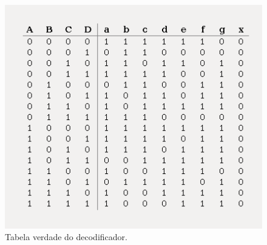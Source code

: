 \documentclass[
	12pt,				%
	openright,			%
	twoside,			%
	a4paper,			%
	english,			%
	french,				%
	spanish,			%
	brazil,				%
	]{abntex2}
\begin{document}
\begin{figure}[H]
	\begin{center}
	    \includegraphics[scale=0.8]{imagens/decodetab.png}
	\end{center}
\caption{\label{decodetabela}Tabela verdade do decodificador.}
\end{figure}
\end{document}
